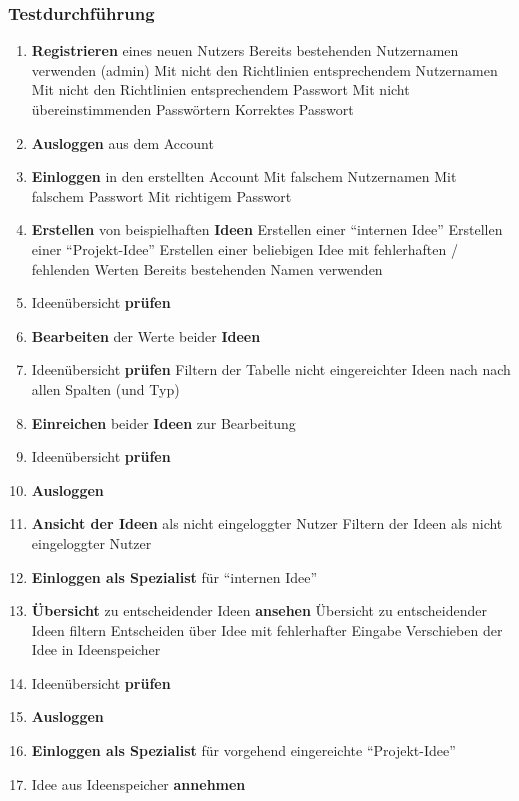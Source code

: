 \subsubsection*{Testdurchführung}
\begin{enumerate}
\item \textbf{Registrieren} eines neuen Nutzers
	\subitem Bereits bestehenden Nutzernamen verwenden (admin)
	\subitem Mit nicht den Richtlinien entsprechendem Nutzernamen
	\subitem Mit nicht den Richtlinien entsprechendem Passwort
	\subitem Mit nicht übereinstimmenden Passwörtern
	\subitem Korrektes Passwort
\item \textbf{Ausloggen} aus dem Account
\item \textbf{Einloggen} in den erstellten Account
	\subitem Mit falschem Nutzernamen
	\subitem Mit falschem Passwort
	\subitem Mit richtigem Passwort
\item \textbf{Erstellen} von beispielhaften \textbf{Ideen}
	\subitem Erstellen einer \enquote{internen Idee}
	\subitem Erstellen einer \enquote{Projekt-Idee}
	\subitem Erstellen einer beliebigen Idee mit fehlerhaften / fehlenden Werten
	\subitem Bereits bestehenden Namen verwenden
\item Ideenübersicht \textbf{prüfen}
\item \textbf{Bearbeiten} der Werte beider \textbf{Ideen}
\item Ideenübersicht \textbf{prüfen}
	\subitem Filtern der Tabelle nicht eingereichter Ideen nach nach allen Spalten (und Typ)
\item \textbf{Einreichen} beider \textbf{Ideen} zur Bearbeitung
\item Ideenübersicht \textbf{prüfen}
\item \textbf{Ausloggen}
\item \textbf{Ansicht der Ideen} als nicht eingeloggter Nutzer
	\subitem Filtern der Ideen als nicht eingeloggter Nutzer
\item \textbf{Einloggen als Spezialist} für \enquote{internen Idee}
\item \textbf{Übersicht} zu entscheidender Ideen \textbf{ansehen}
	\subitem Übersicht zu entscheidender Ideen filtern
	\subitem Entscheiden über Idee mit fehlerhafter Eingabe
	\subitem Verschieben der Idee in Ideenspeicher
\item Ideenübersicht \textbf{prüfen}
\item \textbf{Ausloggen}
\item \textbf{Einloggen als Spezialist} für vorgehend eingereichte \enquote{Projekt-Idee}
\item Idee aus Ideenspeicher \textbf{annehmen}

\end{enumerate}
